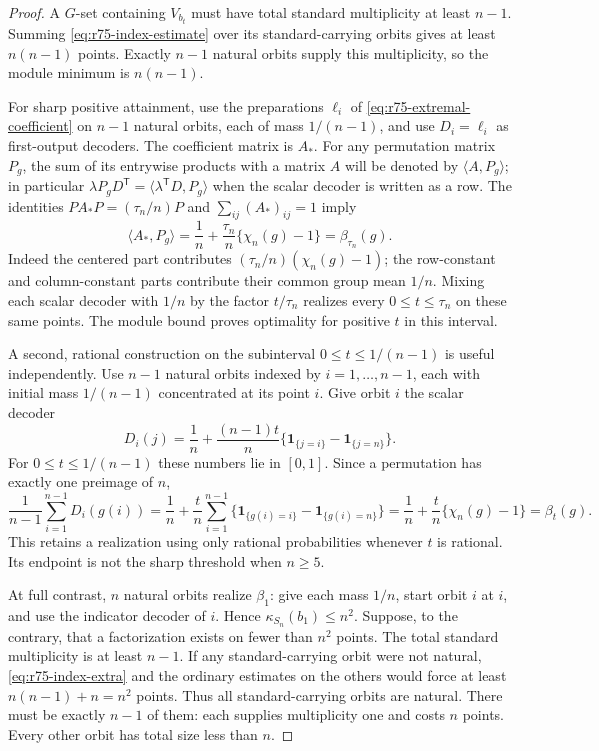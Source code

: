 \begin{proof}
A $G$-set containing $V_{b_t}$ must have total standard multiplicity
at least $n-1$. Summing \eqref{eq:r75-index-estimate} over its
standard-carrying orbits gives at least $n(n-1)$ points.
Exactly $n-1$ natural orbits supply this multiplicity, so the module
minimum is $n(n-1)$.

For sharp positive attainment, use the preparations $\ell_i$ of
\eqref{eq:r75-extremal-coefficient} on $n-1$ natural orbits,
each of mass $1/(n-1)$, and use $D_i=\ell_i$ as first-output
decoders. The coefficient matrix is $A_*$. For any permutation
matrix $P_g$, the sum of its entrywise products with a matrix
$A$ will be denoted by $\langle A,P_g\rangle$; in particular
$\lambda P_gD^{\mathsf T}=\langle\lambda^{\mathsf T}D,P_g\rangle$
when the scalar decoder is written as a row.
The identities $PA_*P=(\tau_n/n)P$ and $\sum_{ij}(A_*)_{ij}=1$
imply
\[
 \langle A_*,P_g\rangle
 =\frac1n+\frac{\tau_n}{n}\{\chi_n(g)-1\}
 =\beta_{\tau_n}(g).
\]
Indeed the centered part contributes
$(\tau_n/n)(\chi_n(g)-1)$; the row-constant and column-constant
parts contribute their common group mean $1/n$.
Mixing each scalar decoder with $1/n$ by the factor $t/\tau_n$
realizes every $0\le t\le\tau_n$ on these same points.
The module bound proves optimality for positive $t$ in this interval.

A second, rational construction on the subinterval
$0\le t\le1/(n-1)$ is useful independently. Use $n-1$ natural orbits indexed by
$i=1,\ldots,n-1$, each with initial mass $1/(n-1)$ concentrated
at its point $i$. Give orbit $i$ the scalar decoder
\begin{equation}\label{eq:r75-symmetric-decoder}
 D_i(j)=\frac1n+\frac{(n-1)t}{n}
                 \{\mathbf1_{\{j=i\}}-\mathbf1_{\{j=n\}}\}.
\end{equation}
For $0\le t\le1/(n-1)$ these numbers lie in $[0,1]$.
Since a permutation has exactly one preimage of $n$,
\[
 \frac1{n-1}\sum_{i=1}^{n-1}D_i(g(i))
 =\frac1n+\frac tn
   \sum_{i=1}^{n-1}
    \{\mathbf1_{\{g(i)=i\}}-\mathbf1_{\{g(i)=n\}}\}
 =\frac1n+\frac tn\{\chi_n(g)-1\}=\beta_t(g).
\]
This retains a realization using only rational probabilities whenever
$t$ is rational. Its endpoint is not the sharp threshold when $n\ge5$.

At full contrast, $n$ natural orbits realize $\beta_1$: give
each mass $1/n$, start orbit $i$ at $i$, and use the indicator
decoder of $i$. Hence $\kappa_{S_n}(b_1)\le n^2$.
Suppose, to the contrary, that a factorization exists on fewer
than $n^2$ points. The total standard multiplicity is at least
$n-1$. If any standard-carrying orbit were not natural,
\eqref{eq:r75-index-extra} and the ordinary estimates on the
others would force at least $n(n-1)+n=n^2$ points. Thus all
standard-carrying orbits are natural. There must be exactly
$n-1$ of them: each supplies multiplicity one and costs $n$
points. Every other orbit has total size less than $n$.


\end{proof}
